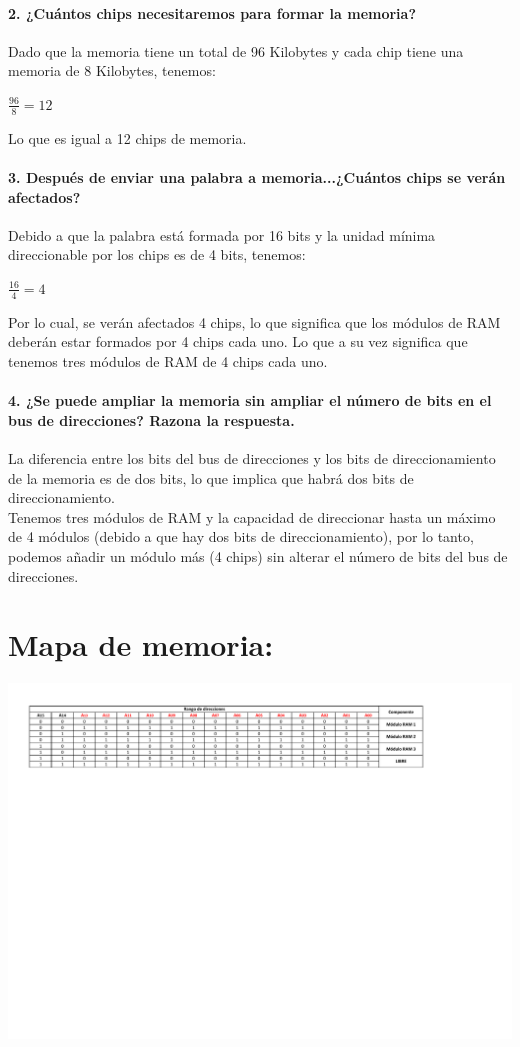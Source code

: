 \documentclass[12pt,letterpapper]{article}
\begin{document}
\paragraph{2. ¿Cuántos chips necesitaremos para formar la memoria?\\}
Dado que la memoria tiene un total de 96 Kilobytes y cada chip tiene una memoria de 8 Kilobytes, tenemos:
\begin{center}
	$\frac{96}{8}=12$
\end{center}
Lo que es igual a 12 chips de memoria.
\paragraph{3. Después de enviar una palabra a memoria...¿Cuántos chips se verán afectados?\\}
Debido a que la palabra está formada por 16 bits y la unidad mínima direccionable por los chips es de 4 bits, tenemos:
\begin{center}
	$\frac{16}{4}=4$
\end{center}
Por lo cual, se verán afectados 4 chips, lo que significa que los módulos de RAM deberán estar formados por 4 chips cada uno. Lo que a su vez significa que tenemos tres módulos de RAM de 4 chips cada uno.
\paragraph{4. ¿Se puede ampliar la memoria sin ampliar el número de bits en el bus de direcciones? Razona la respuesta.\\}
La diferencia entre los bits del bus de direcciones y los bits de direccionamiento de la memoria es de dos bits, lo que implica que habrá dos bits de direccionamiento.\\
Tenemos tres módulos de RAM y la capacidad de direccionar hasta un máximo de 4 módulos (debido a que hay dos bits de direccionamiento), por lo tanto, podemos añadir un módulo más (4 chips) sin alterar el número de bits del bus de direcciones.
\newpage

\section{Mapa de memoria:}
\begin{center}
	\includegraphics[scale=0.475]{Mapa_memoria_52.pdf}
\end{center}
\end{document}
